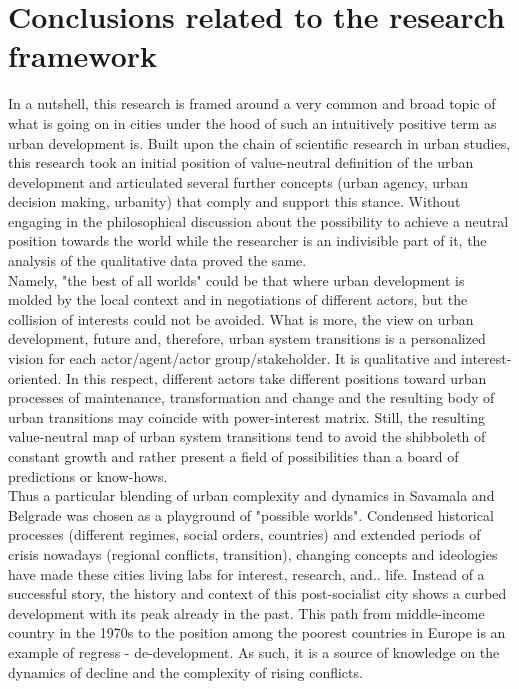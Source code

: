 \documentclass[11pt]{report}
\begin{document}
\section{Conclusions related to the research framework}

In a nutshell, this research is framed around a very common and broad  topic of what is going on in cities under the hood of such an intuitively positive term as urban development is.
Built upon the chain of scientific research in urban studies, this research took an initial position of value-neutral definition of the urban development and articulated several further concepts (urban agency, urban decision making, urbanity) that comply and support this stance.
Without engaging in the philosophical discussion about the possibility to achieve a neutral position towards the world while the researcher is an indivisible part of it, the analysis of the qualitative data proved the same. 
\\
Namely, "the best of all worlds" could be that where urban development is molded by the local context and in negotiations of different actors, but the collision of interests could not be avoided.
What is more, the view on urban development, future and, therefore, urban system transitions is a personalized vision for each actor/agent/actor group/stakeholder. It is qualitative and interest-oriented.
In this respect, different actors take different positions toward urban processes of maintenance, transformation and change and the resulting body of urban transitions may coincide with power-interest matrix.
Still, the resulting value-neutral map of urban system transitions tend to avoid the shibboleth of constant growth and rather present a field of possibilities than a board of predictions or know-hows. 
\\
Thus a particular blending of urban complexity and dynamics in Savamala and Belgrade was chosen as a playground of "possible worlds".
Condensed historical processes (different regimes, social orders, countries) and extended periods of crisis nowadays (regional conflicts, transition), changing concepts and ideologies have made these cities living labs for interest, research, and.. life.
Instead of a successful story, the history and context of this post-socialist city shows a curbed development with its peak already in the past. This path from middle-income country in the 1970s to the position among the poorest countries in Europe is an example of regress - de-development. As such, it is a source of knowledge on the dynamics of decline and the complexity of rising conflicts.
\end{document}
